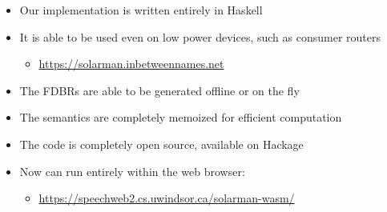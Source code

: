 \documentclass[logoontitle,tabu,supertabular,aspectratio=43]{preney-uwindsor-beamer}
\begin{document}
	\begin{frame}{\insertsection}
		\begin{itemize}
			\item Our implementation is written entirely in Haskell
			\item It is able to be used even on low power devices, such as consumer routers
			\begin{itemize}
				\item \url{https://solarman.inbetweennames.net}
			\end{itemize}
			\item The FDBRs are able to be generated offline or on the fly
			\item The semantics are completely memoized for efficient computation
			\item The code is completely open source, available on Hackage \cite{xsaiga}
            \item Now can run entirely within the web browser:
            \begin{itemize}
                \item \url{https://speechweb2.cs.uwindsor.ca/solarman-wasm/}
            \end{itemize}
		\end{itemize}
	\end{frame}

%
\end{document}
